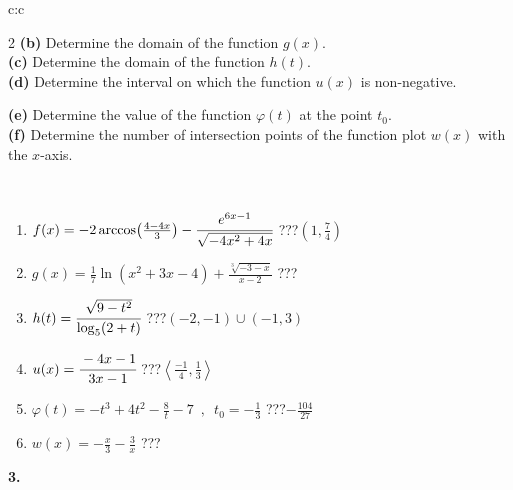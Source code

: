 \documentclass[10pt]{report}
\begin{document}
\begin{tabular}{c:c}
\begin{minipage}[c][104.5mm][t]{0.5\linewidth}
\begin{center}
\begin{minipage}{0.95\linewidth}
\begin{center}
{\begin{multicols}{2}
\textbf{(b)} Determine the domain of the function \(g(x)\). \\[1mm]
\textbf{(c)} Determine the domain of the function \(h(t)\). \\[1mm]
\textbf{(d)} Determine the interval on which the function \(u(x)\) is non-negative. \par \columnbreak
\textbf{(e)} Determine the value of the function \(\varphi(t)\) at the point \(t_0\). \\[1mm]
\textbf{(f)} Determine the number of intersection points of the function plot \(w(x)\) with the \(x\)-axis. \\[1mm]
\end{multicols}
}
\end{center}
\end{minipage}
\\[4mm]
\begin{minipage}{0.79\linewidth}
\begin{center}
\begin{varwidth}{\linewidth}
\begin{enumerate}
\small
\item $f(x) = -2\arccos\!\left( \frac{4-4x}{3} \right) - \cfrac{e^{6x-1}}{\sqrt{-4x^2+4x}}$\quad \dotfill\; ???\;\dotfill \quad $\left(1 , \frac{7}{4}\right)$
\item $g(x) = \frac{1}{7} \ln{\!(x^2+3x-4)}+\frac{\sqrt[3]{-3-x}}{x-2}$\quad \dotfill\; ???\;\dotfill {}
\item $h(t) = \cfrac{\sqrt{9-t^2}}{\log_5(2+t)}$\quad \dotfill\; ???\;\dotfill \quad $\left(-2 , -1\right)\cup\left(-1 , 3\right)$
\item $u(x) = \cfrac{-4x-1}{3x-1}$\quad \dotfill\; ???\;\dotfill \quad $\left\langle\frac{-1}{4} , \frac{1}{3}\right\rangle$
\item $\varphi(t) = -t^3+4t^2-\frac{8}{t}-7 \enspace , \enspace t_0=-\frac{1}{3}$\quad \dotfill\; ???\;\dotfill \quad $-\frac{104}{27}$
\item $w(x) = -\frac{x}{3}-\frac{3}{x}$\quad \dotfill\; ???\;\dotfill {}
\end{enumerate}
\end{varwidth}
\end{center}
\end{minipage}
\begin{minipage}{0.20\linewidth}
\begin{center}
{\Huge\bfseries 3.} \\[2mm]

\end{center}
\end{minipage}
\end{center}
\end{minipage}
\end{tabular}
\end{document}
